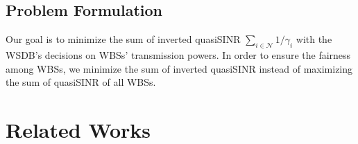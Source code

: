 \documentclass[times]{ettauth}
\theoremstyle{mytheoremstyle}
\theoremstyle{mytheoremstyle}
\theoremstyle{mytheoremstyle}
\begin{document}
\subsection{Problem Formulation}
\label{problemProposed}
Our goal is to minimize the sum of inverted quasiSINR $\sum_{i\in \mathcal{N}}1/{\gamma_{i}}$ with the WSDB's decisions on WBSs' transmission powers.
In order to ensure the fairness among WBSs,  we minimize the sum of inverted quasiSINR instead of maximizing the sum of quasiSINR of all WBSs.



\section{Related Works}
\label{decomposition_relatedwork}
\end{document}
